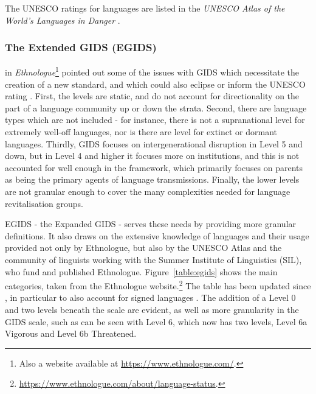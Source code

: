 The UNESCO ratings for languages are listed in the \textit{UNESCO Atlas of the World's Languages in Danger} \citep{unesco2014unesco}.

\subsubsection{The Extended GIDS (EGIDS)}

\citet{lewis2009ethnologue} in \textit{Ethnologue}\footnote{Also a website available at \href{https://www.ethnologue.com/}{https://www.ethnologue.com/}. } pointed out some of the issues with GIDS which necessitate the creation of a new standard, and which could also eclipse or inform the UNESCO rating \citep{lewis2010assessing}. First, the levels are static, and do not account for directionality on the part of a language community up or down the strata. Second, there are language types which are not included - for instance, there is not a supranational level for extremely well-off languages, nor is there are level for extinct or dormant languages. Thirdly, GIDS focuses on intergenerational disruption in Level 5 and down, but in Level 4 and higher it focuses more on institutions, and this is not accounted for well enough in the framework, which primarily focuses on parents as being the primary agents of language transmissions. Finally, the lower levels are not granular enough to cover the many complexities needed for language revitalisation groups.

EGIDS - the Expanded GIDS - serves these needs by providing more granular definitions. It also draws on the extensive knowledge of languages and their usage provided not only by Ethnologue, but also by the UNESCO Atlas and the community of linguists working with the Summer Institute of Linguistics (SIL), who fund and published Ethnologue. Figure~\ref{table:egids} shows the main categories, taken from the Ethnologue website.\footnote{\href{https://www.ethnologue.com/about/language-status}{https://www.ethnologue.com/about/language-status}. } The table has been updated since \citet{lewis2010assessing}, in particular to also account for signed languages \citep{bickford2015rating}. The addition of a Level 0 and two levels beneath the scale are evident, as well as more granularity in the GIDS scale, such as can be seen with Level 6, which now has two levels, Level 6a Vigorous and Level 6b Threatened.

